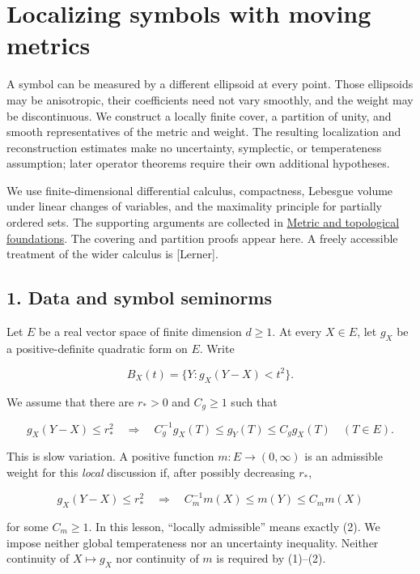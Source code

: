 \documentclass[
  11pt,
]{article}
\author{}
\date{}
\begin{document}
\section{Localizing symbols with moving
metrics}\label{localizing-symbols-with-moving-metrics}

A symbol can be measured by a different ellipsoid at every point. Those
ellipsoids may be anisotropic, their coefficients need not vary
smoothly, and the weight may be discontinuous. We construct a locally
finite cover, a partition of unity, and smooth representatives of the
metric and weight. The resulting localization and reconstruction
estimates make no uncertainty, symplectic, or temperateness assumption;
later operator theorems require their own additional hypotheses.

We use finite-dimensional differential calculus, compactness, Lebesgue
volume under linear changes of variables, and the maximality principle
for partially ordered sets. The supporting arguments are collected in
\href{metric-foundation-bridges.pdf}{Metric and topological foundations}.
The covering and partition proofs appear here. A freely accessible
treatment of the wider calculus is {[}Lerner{]}.

\subsection{1. Data and symbol
seminorms}\label{data-and-symbol-seminorms}

Let \(E\) be a real vector space of finite dimension \(d\geq1\). At
every \(X\in E\), let \(g_X\) be a positive-definite quadratic form on
\(E\). Write

\[
B_X(t)=\{Y:g_X(Y-X)<t^2\}.
\]

We assume that there are \(r_*>0\) and \(C_g\geq1\) such that

\[
g_X(Y-X)\leq r_*^2
\quad\Longrightarrow\quad
C_g^{-1}g_X(T)\leq g_Y(T)\leq C_g g_X(T)
\quad(T\in E).                                      \tag{1}
\]

This is slow variation. A positive function \(m:E\to(0,\infty)\) is an
admissible weight for this \emph{local} discussion if, after possibly
decreasing \(r_*\),

\[
g_X(Y-X)\leq r_*^2
\quad\Longrightarrow\quad
C_m^{-1}m(X)\leq m(Y)\leq C_m m(X)                 \tag{2}
\]

for some \(C_m\geq1\). In this lesson, ``locally admissible'' means
exactly (2). We impose neither global temperateness nor an uncertainty
inequality. Neither continuity of \(X\mapsto g_X\) nor continuity of
\(m\) is required by (1)--(2).
\end{document}
